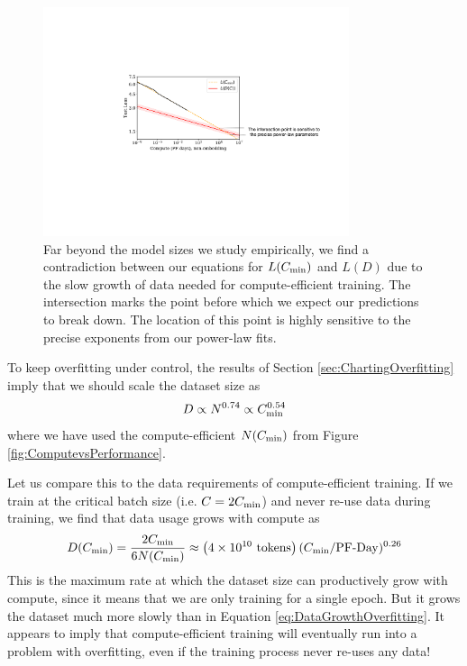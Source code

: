 \documentclass[english]{article}
\newcommand{\be}{\begin{equation}}
\newcommand{\ee}{\end{equation}}
\begin{document}
\begin{figure}
\noindent \centering{}
\includegraphics[width=0.8\textwidth]{Contradiction}
\caption[Contradiction between compute and data trends]{Far beyond the model sizes we study empirically, we find a contradiction between our equations for $L(C_{\rm min})$ and $L(D)$ due to the slow growth of data needed for compute-efficient training.  The intersection marks the point before which we expect our predictions to break down.  The location of this point is highly sensitive to the precise exponents from our power-law fits. \label{fig:Contradiction}}
\end{figure}

To keep overfitting under control, the results of Section \ref{sec:ChartingOverfitting} imply that we should scale the dataset size as
\be
\label{eq:DataGrowthOverfitting}
D \propto N^{0.74} \propto C_{\rm min}^{0.54}
\ee
where we have used the compute-efficient $N(C_{\rm min})$ from Figure \ref{fig:ComputevsPerformance}.

Let us compare this to the data requirements of compute-efficient training.  If we train at the critical batch size (i.e. $C=2C_{\rm min}$) and never re-use data during training, we find that data usage grows with compute as
\be
D (C_{\rm min}) = \frac{2C_{\rm min}}{6 N(C_{\rm min})} \approx \left( 4 \times 10^{10}  \ {\rm tokens} \right) (C_{\rm min} / \mathrm{PF}{\text -}\mathrm{Day}  )^{0.26} 
\ee
This is the maximum rate at which the dataset size can productively grow with compute, since it means that we are only training for a single epoch.  But it grows the dataset much more slowly than in Equation \eqref{eq:DataGrowthOverfitting}.  It appears to imply that compute-efficient training will eventually run into a problem with overfitting, even if the training process never re-uses any data!
\end{document}
